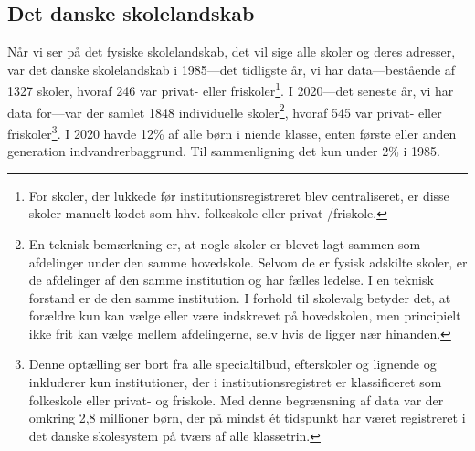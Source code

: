 \documentclass[
]{book}
\begin{document}
\subsection{Det danske skolelandskab}\label{det-danske-skolelandskab}

Når vi ser på det fysiske skolelandskab, det vil sige alle skoler og deres adresser, var det danske skolelandskab i 1985---det tidligste år, vi har data---bestående af 1327 skoler, hvoraf 246 var privat- eller friskoler\footnote{For skoler, der lukkede før institutionsregistreret blev centraliseret, er disse skoler manuelt kodet som hhv. folkeskole eller privat-/friskole.}. I 2020---det seneste år, vi har data for---var der samlet 1848 individuelle skoler\footnote{En teknisk bemærkning er, at nogle skoler er blevet lagt sammen som afdelinger under den samme hovedskole. Selvom de er fysisk adskilte skoler, er de afdelinger af den samme institution og har fælles ledelse. I en teknisk forstand er de den samme institution. I forhold til skolevalg betyder det, at forældre kun kan vælge eller være indskrevet på hovedskolen, men principielt ikke frit kan vælge mellem afdelingerne, selv hvis de ligger nær hinanden.}, hvoraf 545 var privat- eller friskoler\footnote{Denne optælling ser bort fra alle specialtilbud, efterskoler og lignende og inkluderer kun institutioner, der i institutionsregistret er klassificeret som folkeskole eller privat- og friskole. Med denne begrænsning af data var der omkring 2,8 millioner børn, der på mindst ét tidspunkt har været registreret i det danske skolesystem på tværs af alle klassetrin.}. I 2020 havde 12\% af alle børn i niende klasse, enten første eller anden generation indvandrerbaggrund. Til sammenligning det kun under 2\% i 1985.
\end{document}
